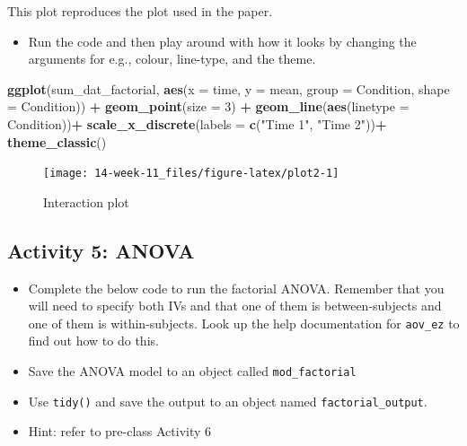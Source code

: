 \documentclass[]{book}
\newenvironment{Shaded}{\begin{snugshade}}{\end{snugshade}}
\newcommand{\DataTypeTok}[1]{\textcolor[rgb]{0.13,0.29,0.53}{#1}}
\newcommand{\DecValTok}[1]{\textcolor[rgb]{0.00,0.00,0.81}{#1}}
\newcommand{\KeywordTok}[1]{\textcolor[rgb]{0.13,0.29,0.53}{\textbf{#1}}}
\newcommand{\NormalTok}[1]{#1}
\newcommand{\OperatorTok}[1]{\textcolor[rgb]{0.81,0.36,0.00}{\textbf{#1}}}
\newcommand{\StringTok}[1]{\textcolor[rgb]{0.31,0.60,0.02}{#1}}
\providecommand{\tightlist}{%
  \setlength{\itemsep}{0pt}\setlength{\parskip}{0pt}}
\begin{document}
This plot reproduces the plot used in the paper.

\begin{itemize}
\tightlist
\item
  Run the code and then play around with how it looks by changing the arguments for e.g., colour, line-type, and the theme.
\end{itemize}

\begin{Shaded}
\begin{Highlighting}[]
\KeywordTok{ggplot}\NormalTok{(sum_dat_factorial, }\KeywordTok{aes}\NormalTok{(}\DataTypeTok{x =}\NormalTok{ time, }\DataTypeTok{y =}\NormalTok{ mean, }\DataTypeTok{group =}\NormalTok{ Condition, }\DataTypeTok{shape =}\NormalTok{ Condition)) }\OperatorTok{+}
\StringTok{  }\KeywordTok{geom_point}\NormalTok{(}\DataTypeTok{size =} \DecValTok{3}\NormalTok{) }\OperatorTok{+}
\StringTok{  }\KeywordTok{geom_line}\NormalTok{(}\KeywordTok{aes}\NormalTok{(}\DataTypeTok{linetype =}\NormalTok{ Condition))}\OperatorTok{+}
\StringTok{  }\KeywordTok{scale_x_discrete}\NormalTok{(}\DataTypeTok{labels =} \KeywordTok{c}\NormalTok{(}\StringTok{"Time 1"}\NormalTok{, }\StringTok{"Time 2"}\NormalTok{))}\OperatorTok{+}
\StringTok{  }\KeywordTok{theme_classic}\NormalTok{()}
\end{Highlighting}
\end{Shaded}

\begin{figure}

{\centering \texttt{[image: 14-week-11\_files/figure-latex/plot2-1]} 

}

\caption{Interaction plot}\label{fig:plot2}
\end{figure}

\hypertarget{activity-5-anova}{%
\subsection{Activity 5: ANOVA}\label{activity-5-anova}}

\begin{itemize}
\item
  Complete the below code to run the factorial ANOVA. Remember that you will need to specify both IVs and that one of them is between-subjects and one of them is within-subjects. Look up the help documentation for \texttt{aov\_ez} to find out how to do this.
\item
  Save the ANOVA model to an object called \texttt{mod\_factorial}
\item
  Use \texttt{tidy()} and save the output to an object named \texttt{factorial\_output}.
\item
  Hint: refer to pre-class Activity 6
\end{itemize}
\end{document}
